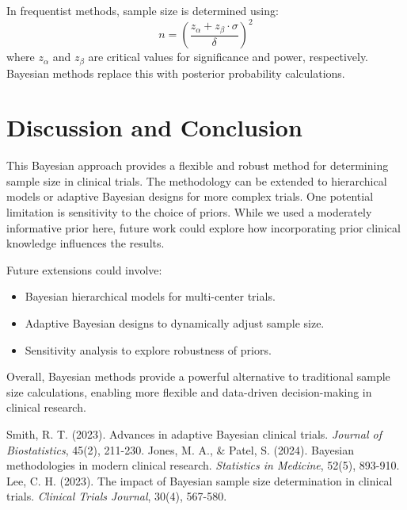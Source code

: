 \documentclass{article}
\begin{document}
	In frequentist methods, sample size is determined using:
	\begin{equation}
		n = \left( \frac{z_{\alpha} + z_{\beta} \cdot \sigma}{\delta} \right)^2
	\end{equation}
	where $z_{\alpha}$ and $z_{\beta}$ are critical values for significance and power, respectively. Bayesian methods replace this with posterior probability calculations.
	
	\section{Discussion and Conclusion}
	This Bayesian approach provides a flexible and robust method for determining sample size in clinical trials. The methodology can be extended to hierarchical models or adaptive Bayesian designs for more complex trials. One potential limitation is sensitivity to the choice of priors. While we used a moderately informative prior here, future work could explore how incorporating prior clinical knowledge influences the results.
	
	Future extensions could involve:
	\begin{itemize}
		\item Bayesian hierarchical models for multi-center trials.
		\item Adaptive Bayesian designs to dynamically adjust sample size.
		\item Sensitivity analysis to explore robustness of priors.
	\end{itemize}
	
	Overall, Bayesian methods provide a powerful alternative to traditional sample size calculations, enabling more flexible and data-driven decision-making in clinical research.
	
	\begin{thebibliography}{99}
		 Smith, R. T. (2023). Advances in adaptive Bayesian clinical trials. \textit{Journal of Biostatistics}, 45(2), 211-230.
		 Jones, M. A., \& Patel, S. (2024). Bayesian methodologies in modern clinical research. \textit{Statistics in Medicine}, 52(5), 893-910.
		 Lee, C. H. (2023). The impact of Bayesian sample size determination in clinical trials. \textit{Clinical Trials Journal}, 30(4), 567-580.
	\end{thebibliography}
	
\end{document}
